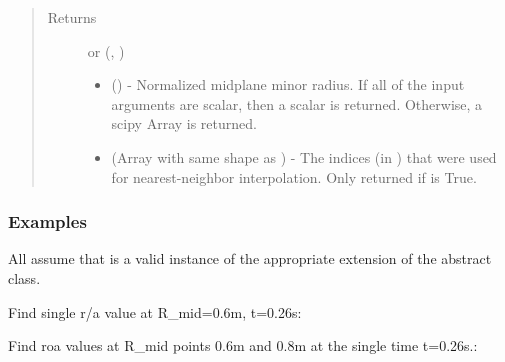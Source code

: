 \documentclass[letterpaper,10pt,english]{sphinxmanual}
\begin{document}
\begin{fulllineitems}
\begin{fulllineitems}
\begin{quote}
\begin{description}
\begin{itemize}
\end{itemize}

\item[{Returns}] \leavevmode

 or (, )
\begin{itemize}
\item {} 
 () - Normalized midplane minor
radius. If all of the input arguments are scalar, then a scalar
is returned. Otherwise, a scipy Array is returned.

\item {} 
 (Array with same shape as ) - The indices
(in ) that were used for
nearest-neighbor interpolation. Only returned if  is
True.

\end{itemize}


\end{description}\end{quote}
\subsubsection*{Examples}

All assume that  is a valid instance of the appropriate
extension of the {\hyperref[\detokenize{eqtools:eqtools.core.Equilibrium}]{}} abstract class.

Find single r/a value at R\_mid=0.6m, t=0.26s:

\begin{sphinxVerbatim}[commandchars=\\\{\}]
   
\end{sphinxVerbatim}

Find roa values at R\_mid points 0.6m and 0.8m at the
single time t=0.26s.:

\begin{sphinxVerbatim}[commandchars=\\\{\}]
  \PYG{p}{[} \PYG{p}{]} 
\end{sphinxVerbatim}


\end{fulllineitems}
\end{fulllineitems}
\end{document}
